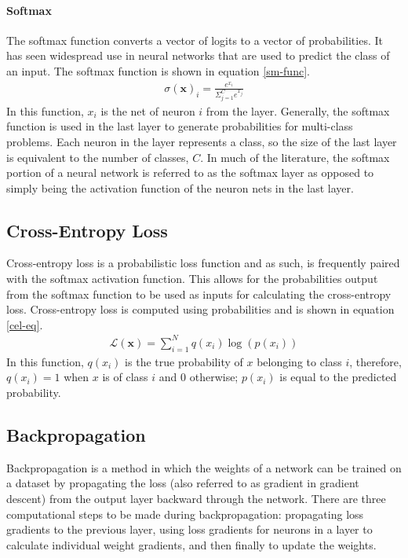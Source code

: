 \paragraph{Softmax}
The softmax function converts a vector of logits to a vector of probabilities. It has seen widespread use in neural networks that are used to predict the class of an input. The softmax function is shown in equation \ref{sm-func}.
\begin{align}
\sigma(\mathbf{x})_i = \frac{e^{x_i}}{\Sigma_{j=1}^C e^{x_j}} \label{sm-func}
\end{align}
In this function, $x_i$ is the net of neuron $i$ from the layer. Generally, the softmax function is used in the last layer to generate probabilities for multi-class problems. Each neuron in the layer represents a class, so the size of the last layer is equivalent to the number of classes, $C$. In much of the literature, the softmax portion of a neural network is referred to as the softmax layer as opposed to simply being the activation function of the neuron nets in the last layer.


\subsection{Cross-Entropy Loss}
Cross-entropy loss is a probabilistic loss function and as such, is frequently paired with the softmax activation function. This allows for the probabilities output from the softmax function to be used as inputs for calculating the cross-entropy loss. Cross-entropy loss is computed using probabilities and is shown in equation \ref{cel-eq}.
\begin{align}
\mathcal{L}(\mathbf{x}) = \sum_{i=1}^{N} q(x_i)\log(p(x_i))\label{cel-eq}
\end{align}
In this function, $q(x_i)$ is the true probability of $x$ belonging to class $i$, therefore, $q(x_i) = 1$ when $x$ is of class $i$ and $0$ otherwise; $p(x_i)$ is equal to the predicted probability.

\subsection{Backpropagation}\label{backprop}
Backpropagation is a method in which the weights of a network can be trained on a dataset by propagating the loss (also referred to as gradient in gradient descent) from the output layer backward through the network. There are three computational steps to be made during backpropagation: propagating loss gradients to the previous layer, using loss gradients for neurons in a layer to calculate individual weight gradients, and then finally to update the weights.

